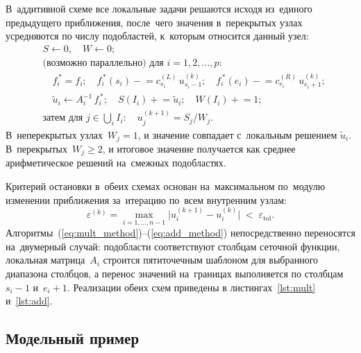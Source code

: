 В~аддитивной схеме все локальные задачи решаются исходя из~единого
предыдущего приближения, после~чего значения в~перекрытых узлах усредняются по
числу подобластей, к~которым относится данный узел:
\begin{equation}\label{eq:add_method}
	\begin{aligned}
		 & S \leftarrow 0,\quad W \leftarrow 0;                       \\
		 & \text{(возможно параллельно) для~} i = 1,2,\dots,p:        \\
		 & \quad
		f_i^{\,*} = f_i;\quad
		f_i^{\,*}(s_i) \mathrel{-}= c^{(L)}_{s_i}\,u^{(k)}_{s_i - 1};\quad
		f_i^{\,*}(e_i) \mathrel{-}= c^{(R)}_{e_i}\,u^{(k)}_{e_i + 1}; \\
		 & \quad
		\tilde{u}_i \leftarrow A_i^{-1}\,f_i^{\,*};\quad
		S(I_i) \mathrel{+}= \tilde{u}_i;\quad W(I_i) \mathrel{+}= 1;  \\
		 & \text{затем для~} j\in\bigcup_i I_i:\quad
		u^{(k+1)}_j = S_j / W_j.
	\end{aligned}
\end{equation}
В~неперекрытых узлах~$W_j=1$, и значение совпадает с~локальным решением
$\tilde{u}_i$. В~перекрытых~$W_j\geqslant 2$, и итоговое значение получается
как среднее арифметическое решений на~смежных подобластях.

Критерий остановки в~обеих схемах основан на~максимальном по~модулю
изменении приближения за~итерацию по~всем внутренним узлам:
\begin{equation}\label{eq:stop_crit}
	\varepsilon^{(k)} = \max_{i=1,\dots,n-1}
	\bigl|u^{(k+1)}_i - u^{(k)}_i\bigr|
	\;<\;\varepsilon_{\text{tol}}.
\end{equation}
Алгоритмы~(\ref{eq:mult_method})--(\ref{eq:add_method}) непосредственно
переносятся на~двумерный случай: подобласти соответствуют столбцам сеточной
функции, локальная матрица~$A_i$ строится пятиточечным шаблоном для
выбранного диапазона столбцов, а перенос значений на~границах выполняется по
столбцам~$s_i-1$ и~$e_i+1$. Реализации обеих схем приведены в
листингах~\ref{lst:mult} и~\ref{lst:add}.

\subsection{Модельный пример}

